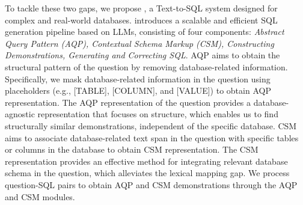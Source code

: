 To tackle these two gaps, we propose \model, a Text-to-SQL system designed for complex and real-world databases. \model introduces a scalable and efficient SQL generation pipeline based on LLMs, consisting of four components: \textit{Abstract Query Pattern (AQP), Contextual Schema Markup (CSM), Constructing Demonstrations, Generating and Correcting SQL}.
AQP aims to obtain the structural pattern of the question by removing database-related information.
Specifically, we mask database-related information in the question using placeholders (e.g., [TABLE], [COLUMN], and [VALUE]) to obtain AQP representation.
The AQP representation of the question provides a database-agnostic representation that focuses on structure, which enables us to find structurally similar demonstrations, independent of the specific database. 
CSM aims to associate database-related text span in the question with specific tables or columns in the database to obtain CSM representation.
The CSM representation provides an effective method for integrating relevant database schema in the question, which alleviates the lexical mapping gap.
We process question-SQL pairs to obtain AQP and CSM demonstrations through the AQP and CSM modules.

